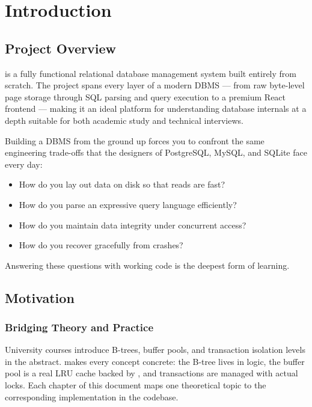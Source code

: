 \chapter{Introduction}
\label{ch:introduction}

\section{Project Overview}

\shiftdb{} is a fully functional relational database management system built entirely from scratch.  The project spans every layer of a modern DBMS --- from raw byte-level page storage through SQL parsing and query execution to a premium React frontend --- making it an ideal platform for understanding database internals at a depth suitable for both academic study and technical interviews.

\begin{conceptbox}
Building a DBMS from the ground up forces you to confront the same engineering trade-offs that the designers of PostgreSQL, MySQL, and SQLite face every day:
\begin{itemize}[nosep]
  \item How do you lay out data on disk so that reads are fast?
  \item How do you parse an expressive query language efficiently?
  \item How do you maintain data integrity under concurrent access?
  \item How do you recover gracefully from crashes?
\end{itemize}
Answering these questions with working code is the deepest form of learning.
\end{conceptbox}

\section{Motivation}

\subsection{Bridging Theory and Practice}
University courses introduce B-trees, buffer pools, and transaction isolation levels in the abstract.  \shiftdb{} makes every concept concrete: the B-tree lives in  logic, the buffer pool is a real LRU cache backed by , and transactions are managed with actual locks.  Each chapter of this document maps one theoretical topic to the corresponding implementation in the codebase.

